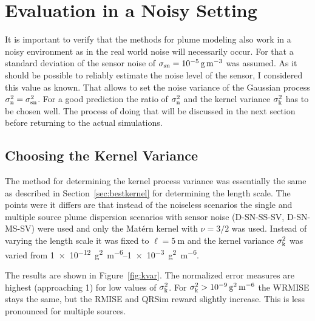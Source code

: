 \section{Evaluation in a Noisy Setting}\label{sec:noisy}
It is important to verify that the methods for plume modeling also work in 
a noisy environment as in the real world noise will necessarily occur. For that 
a standard deviation of the sensor noise of $\sigma_{\mathrm{sn}} 
= \SI{1e-5}{\gram\per\meter\cubed}$ was assumed. As it should be possible to 
reliably estimate the noise level of the sensor, I considered this value as 
known. That allows to set the noise variance of the Gaussian process 
$\sigma_{\mathrm{n}}^2 = \sigma_{\mathrm{sn}}^2$. For a good prediction the ratio of 
$\sigma_{\mathrm{n}}^2$ and the kernel variance $\sigma_{\mathrm{k}}^2$ has to be chosen 
well. The process of doing that will be discussed in the next section before 
returning to the actual simulations.

\subsection{Choosing the Kernel Variance}
The method for determining the kernel process variance was essentially the same 
as described in Section~\ref{sec:bestkernel} for determining the length scale.  
The points were it differs are that instead of the noiseless scenarios the 
single and multiple source plume dispersion scenarios with sensor noise 
(D-SN-SS-SV, D-SN-MS-SV) were used and only the Mat\'ern kernel with $\nu = 3/2$ 
was used.  Instead of varying the length scale it was fixed to $\ell 
= \SI{5}{\meter}$ and the kernel variance $\sigma_{\mathrm{k}}^2$ was varied from 
\SIrange{1e-12}{1e-3}{\gram\squared\per\meter\tothe{6}}.

The results are shown in Figure~\ref{fig:kvar}. The normalized error measures 
are highest (approaching 1) for low values of $\sigma_{\mathrm{k}}^2$.  For 
$\sigma\ped{k}^2 > \SI{1e-9}{\gram\squared\per\meter\tothe{6}}$ the WRMISE stays 
the same, but the RMISE and QRSim reward slightly increase. This is less 
pronounced for multiple sources.

